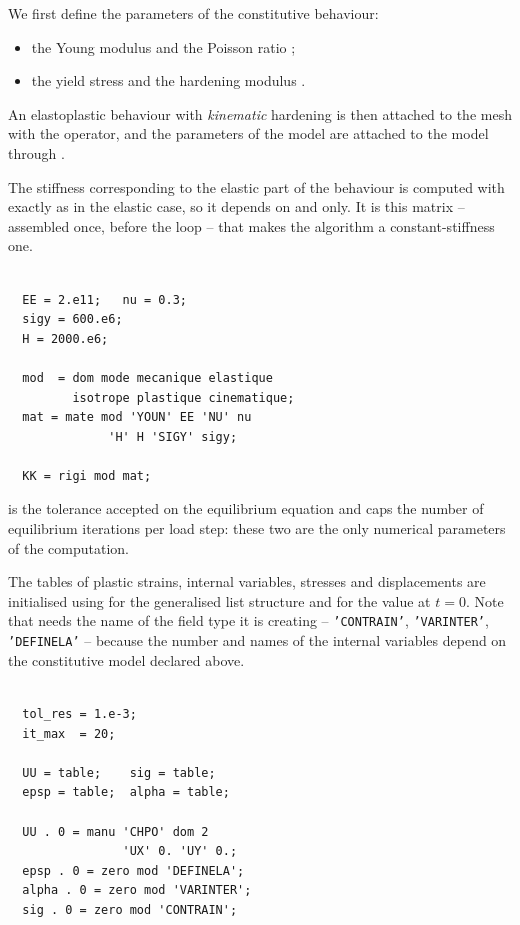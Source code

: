 \begin{castemcom}
We first define the parameters of the constitutive behaviour:

\begin{itemize}
\item the Young modulus  and the Poisson ratio ;
\item the yield stress  and the hardening modulus .
\end{itemize}

\noindent An elastoplastic behaviour with \emph{kinematic} hardening is then
attached to the mesh  with the  operator, and the
parameters of the model are attached to the model  through
.

The stiffness  corresponding to the elastic part of the behaviour is
computed with  exactly as in the elastic case, so it depends
on  and  only. It is this matrix -- assembled once, before the
loop -- that makes the algorithm a constant-stiffness one.

\end{castemcom}
\begin{castemlines}
\begin{verbatim}

  EE = 2.e11;   nu = 0.3;
  sigy = 600.e6;
  H = 2000.e6;

  mod  = dom mode mecanique elastique
         isotrope plastique cinematique;
  mat = mate mod 'YOUN' EE 'NU' nu
              'H' H 'SIGY' sigy;

  KK = rigi mod mat;

\end{verbatim}
\end{castemlines}

\begin{castemcom}
 is the tolerance accepted on the equilibrium equation and
 caps the number of equilibrium iterations per load step: these
two are the only numerical parameters of the computation.

The tables of plastic strains, internal variables, stresses and displacements
are initialised using  for the generalised list structure and
 for the value at $t=0$. Note that  needs the name of the
field type it is creating -- \texttt{'CONTRAIN'}, \texttt{'VARINTER'},
\texttt{'DEFINELA'} -- because the number and names of the internal variables
depend on the constitutive model declared above.
\end{castemcom}
\begin{castemlines}
\begin{verbatim}

  tol_res = 1.e-3;
  it_max  = 20;

  UU = table;    sig = table;
  epsp = table;  alpha = table;

  UU . 0 = manu 'CHPO' dom 2
                'UX' 0. 'UY' 0.;
  epsp . 0 = zero mod 'DEFINELA';
  alpha . 0 = zero mod 'VARINTER';
  sig . 0 = zero mod 'CONTRAIN';

\end{verbatim}
\end{castemlines}



